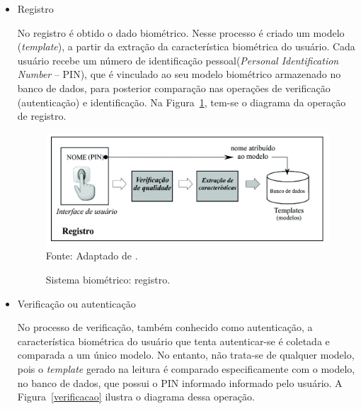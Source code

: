 \begin{itemize}
     

\item Registro

  No registro é obtido o dado biométrico. Nesse processo é criado um modelo (\textit{template}), a partir da extração da característica biométrica do usuário. Cada usuário recebe um número de identificação pessoal(\textit {Personal Identification Number} -- PIN), que é vinculado ao seu modelo biométrico 
  armazenado no banco de dados, para posterior comparação nas operações de verificação (autenticação) e identificação. Na Figura~\ref{registro}, tem-se o diagrama da operação de registro. 


 \begin{figure}[!ht]
  \begin{center}
  \caption{Sistema biométrico: registro.}
  \includegraphics[scale=0.45]{figuras/cap2/registro.jpg}\\
  Fonte: Adaptado de \cite{maltoni2009handbook}.
  \label{registro}
  \end{center}
  \end{figure}
 


\item Verificação ou autenticação 

  No processo de verificação, também conhecido como autenticação, a característica biométrica do usuário que tenta autenticar-se é coletada e comparada a um único modelo. No entanto, não trata-se de qualquer modelo, pois o \textit{template} gerado na leitura é comparado especificamente com o modelo, no banco de dados, que possui o PIN informado informado pelo usuário. A Figura~\ref{verificacao} ilustra o diagrama dessa operação. 


\end{itemize}
